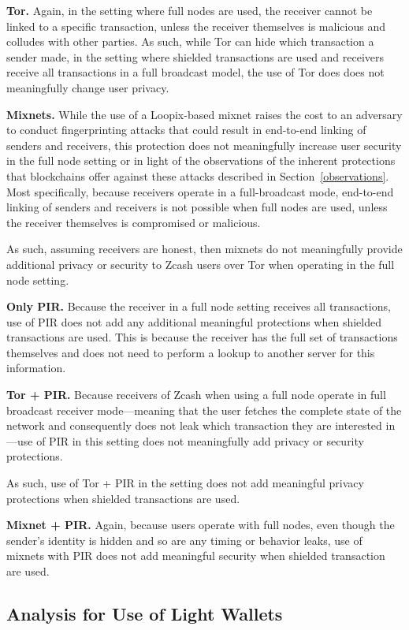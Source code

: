 \documentclass{article}
\begin{document}
\textbf{Tor.}
Again, in the setting where full nodes are used, the receiver cannot be linked
to a specific transaction, unless the receiver themselves is malicious and
colludes with other parties. As
such, while Tor can hide which transaction a sender made, in the setting where
shielded transactions are used and receivers receive all transactions in a full
broadcast model, the use of Tor does does not meaningfully change user privacy.

\textbf{Mixnets.}
While the use of a Loopix-based mixnet raises the cost to an adversary to
conduct fingerprinting attacks that could result in end-to-end linking of
senders and receivers, this protection does not meaningfully increase user
security in the full node setting or in light of the observations of the
inherent protections that blockchains offer against these attacks described in
Section~\ref{observations}. Most specifically, because receivers operate in a
full-broadcast mode, end-to-end linking of senders and receivers is not
possible when full nodes are used, unless the receiver themselves is
compromised or malicious.

As such, assuming receivers are honest, then mixnets do not meaningfully provide
additional privacy or security to Zcash users over Tor when operating in the
full node setting.

\textbf{Only PIR.}
Because the receiver in a full node setting receives all transactions, use of
PIR does not add any additional meaningful protections when shielded
transactions are used. This is because the receiver has the full set of
transactions themselves and does not need to perform a lookup to another server
for this information.

\textbf{Tor + PIR.}
Because receivers of Zcash when using a full node operate in full broadcast
receiver mode---meaning that the user fetches the complete state of the network
and consequently does not leak which transaction they are interested in---use
of PIR in this setting does not meaningfully add privacy or security
protections.

As such, use of Tor + PIR in the setting does not add meaningful privacy
protections when shielded transactions are used.

\textbf{Mixnet + PIR.}
Again, because users operate with full nodes, even though the sender's identity
is hidden and so are any timing or behavior leaks, use of mixnets with PIR does
not add meaningful security when shielded transaction are used.

\subsection{Analysis for Use of Light Wallets}
\end{document}
